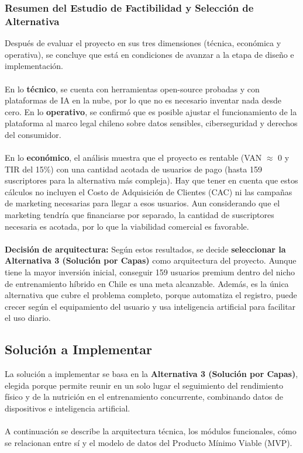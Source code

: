 \subsubsection{Resumen del Estudio de Factibilidad y Selección de Alternativa}
Después de evaluar el proyecto en sus tres dimensiones (técnica, económica y operativa), se concluye que está en condiciones de avanzar a la etapa de diseño e implementación.
\\\\
En lo \textbf{técnico}, se cuenta con herramientas open-source probadas y con plataformas de IA en la nube, por lo que no es necesario inventar nada desde cero. En lo \textbf{operativo}, se confirmó que es posible ajustar el funcionamiento de la plataforma al marco legal chileno sobre datos sensibles, ciberseguridad y derechos del consumidor.
\\\\
En lo \textbf{económico}, el análisis muestra que el proyecto es rentable (VAN $\approx$ 0 y TIR del 15\%) con una cantidad acotada de usuarios de pago (hasta 159 suscriptores para la alternativa más compleja). Hay que tener en cuenta que estos cálculos no incluyen el Costo de Adquisición de Clientes (CAC) ni las campañas de marketing necesarias para llegar a esos usuarios. Aun considerando que el marketing tendría que financiarse por separado, la cantidad de suscriptores necesaria es acotada, por lo que la viabilidad comercial es favorable.
\\\\
\textbf{Decisión de arquitectura:} Según estos resultados, se decide \textbf{seleccionar la Alternativa 3 (Solución por Capas)} como arquitectura del proyecto. Aunque tiene la mayor inversión inicial, conseguir 159 usuarios premium dentro del nicho de entrenamiento híbrido en Chile es una meta alcanzable. Además, es la única alternativa que cubre el problema completo, porque automatiza el registro, puede crecer según el equipamiento del usuario y usa inteligencia artificial para facilitar el uso diario.
\subsection{Solución a Implementar}
La solución a implementar se basa en la \textbf{Alternativa 3 (Solución por Capas)}, elegida porque permite reunir en un solo lugar el seguimiento del rendimiento físico y de la nutrición en el entrenamiento concurrente, combinando datos de dispositivos e inteligencia artificial.
\\\\
A continuación se describe la arquitectura técnica, los módulos funcionales, cómo se relacionan entre sí y el modelo de datos del Producto Mínimo Viable (MVP).
